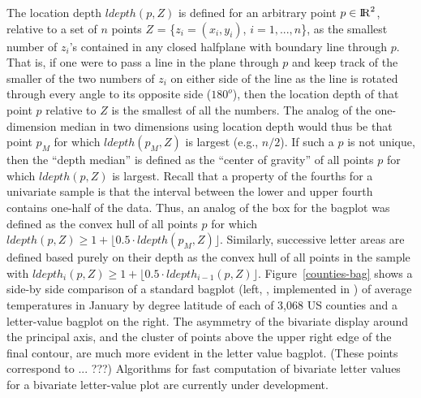 \documentclass[12pt,oneside]{article}
\newcommand{\Reals}{{\rm I\kern-.1667em{}R}}
\begin{document}
The location depth $ldepth(p,Z)$ is defined for an arbitrary point $p \in \Reals^2$, relative to a set of $n$ points $Z$ = \{$z_i = (x_i, y_i)$, $i = 1,...,n$\}, as the smallest number of $z_i$'s contained in any closed halfplane with boundary line through $p$. That is, if one were to pass a line in the plane through $p$ and keep track of the smaller of the two numbers of $z_i$ on either side of the line as the line is rotated through every angle to its opposite side ($180^o$), then the location depth of that point $p$ relative to $Z$ is the smallest of all the numbers. The analog of the one-dimension median in two dimensions using location depth would thus be that point $p_M$ for which $ldepth(p_M, Z)$ is largest (e.g., $n/2$). If such a $p$ is not unique, then the ``depth median'' is defined as the ``center of gravity'' of all points $p$ for which $ldepth(p,Z)$ is largest. Recall that a property of the fourths for a univariate sample is that the interval between the lower and upper fourth contains one-half of the data. Thus, an analog of the box for the bagplot was defined as the convex hull of all points $p$ for which $ldepth(p,Z) \ge 1 +  \lfloor 0.5 \cdot  ldepth(p_M, Z) \rfloor$. Similarly,  successive letter areas are defined based purely on their depth as the convex hull of all points in the sample with $ldepth_i(p,Z) \ge 1 +  \lfloor 0.5 \cdot  ldepth_{i-1}(p, Z) \rfloor$.
Figure~\ref{counties-bag} shows a side-by side comparison of a standard bagplot (left, \citet{bagplots}, implemented in \citet{aplpack}) of average temperatures in January by degree latitude of each of 3,068 US counties and a letter-value bagplot on the right.
The asymmetry of the bivariate display around the principal axis,
and the cluster of points above the upper right edge of the final contour,
are much more evident in the letter value bagplot.  (These points
correspond to ... ???)
Algorithms for fast computation of bivariate letter values for a bivariate letter-value plot are currently under development.
\end{document}
